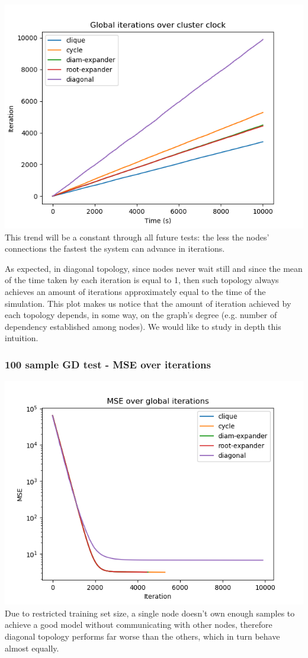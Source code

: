 \documentclass[11pt]{article}
\makeatletter
\def\maxwidth{\ifdim\Gin@nat@width>\linewidth\linewidth
    \else\Gin@nat@width\fi}
\let\Oldincludegraphics\includegraphics
\renewcommand{\includegraphics}[1]{\Oldincludegraphics[width=.8\maxwidth]{#1}}
\makeatother
\begin{document}
\includegraphics{media/img/tests/test_003_100samples_classic/1_iter_time.png}
This trend will be a constant through all future tests: the less the
nodes' connections the fastest the system can advance in iterations.

As expected, in diagonal topology, since nodes never wait still and
since the mean of the time taken by each iteration is equal to 1, then
such topology always achieves an amount of iterations approximately
equal to the time of the simulation. This plot makes us notice that the
amount of iteration achieved by each topology depends, in some way, on
the graph's degree (e.g. number of dependency established among nodes).
We would like to study in depth this intuition.

    \subsubsection{100 sample GD test - MSE over
iterations}\label{sample-gd-test---mse-over-iterations}

\includegraphics{media/img/tests/test_003_100samples_classic/2_mse_iter.png}
Due to restricted training set size, a single node doesn't own enough
samples to achieve a good model without communicating with other nodes,
therefore diagonal topology performs far worse than the others, which in
turn behave almost equally.
\end{document}
